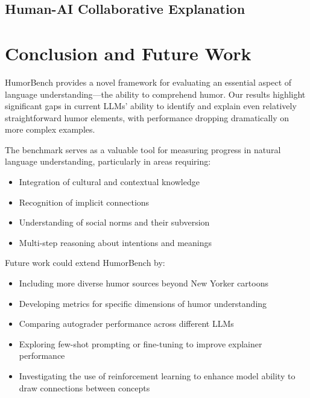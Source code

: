 \documentclass[twocolumn]{article}
\begin{document}

\subsection{Human-AI Collaborative Explanation}


\section{Conclusion and Future Work}

HumorBench provides a novel framework for evaluating an essential aspect of language understanding—the ability to comprehend humor. Our results highlight significant gaps in current LLMs' ability to identify and explain even relatively straightforward humor elements, with performance dropping dramatically on more complex examples.

The benchmark serves as a valuable tool for measuring progress in natural language understanding, particularly in areas requiring:
\begin{itemize}
    \item Integration of cultural and contextual knowledge
    \item Recognition of implicit connections
    \item Understanding of social norms and their subversion
    \item Multi-step reasoning about intentions and meanings
\end{itemize}

Future work could extend HumorBench by:
\begin{itemize}
    \item Including more diverse humor sources beyond New Yorker cartoons
    \item Developing metrics for specific dimensions of humor understanding
    \item Comparing autograder performance across different LLMs
    \item Exploring few-shot prompting or fine-tuning to improve explainer performance
    \item Investigating the use of reinforcement learning to enhance model ability to draw connections between concepts
\end{itemize}
\end{document}
